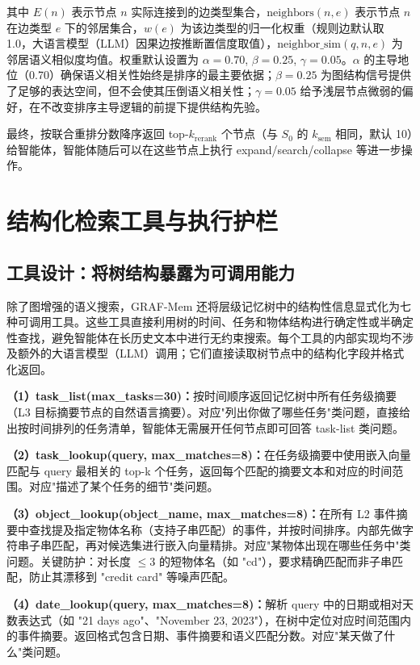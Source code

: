 其中 $E(n)$ 表示节点 $n$ 实际连接到的边类型集合，$\mathrm{neighbors}(n, e)$ 表示节点 $n$ 在边类型 $e$ 下的邻居集合，$w(e)$ 为该边类型的归一化权重（规则边默认取 1.0，大语言模型（LLM）因果边按推断置信度取值），$\mathrm{neighbor\_sim}(q, n, e)$ 为邻居语义相似度均值。权重默认设置为 $\alpha=0.70$, $\beta=0.25$, $\gamma=0.05$。$\alpha$ 的主导地位（0.70）确保语义相关性始终是排序的最主要依据；$\beta=0.25$ 为图结构信号提供了足够的表达空间，但不会使其压倒语义相关性；$\gamma=0.05$ 给予浅层节点微弱的偏好，在不改变排序主导逻辑的前提下提供结构先验。

最终，按联合重排分数降序返回 top-$k_{\mathrm{rerank}}$ 个节点（与 $S_0$ 的 $k_{\mathrm{sem}}$ 相同，默认 10）给智能体，智能体随后可以在这些节点上执行 expand/search/collapse 等进一步操作。

\section{结构化检索工具与执行护栏}

\subsection{工具设计：将树结构暴露为可调用能力}

除了图增强的语义搜索，GRAF-Mem 还将层级记忆树中的结构性信息显式化为七种可调用工具。这些工具直接利用树的时间、任务和物体结构进行确定性或半确定性查找，避免智能体在长历史文本中进行无约束搜索。每个工具的内部实现均不涉及额外的大语言模型（LLM）调用；它们直接读取树节点中的结构化字段并格式化返回。

\textbf{（1）task\_list(max\_tasks=30)：}按时间顺序返回记忆树中所有任务级摘要（L3 目标摘要节点的自然语言摘要）。对应"列出你做了哪些任务"类问题，直接给出按时间排列的任务清单，智能体无需展开任何节点即可回答 task-list 类问题。

\textbf{（2）task\_lookup(query, max\_matches=8)：}在任务级摘要中使用嵌入向量匹配与 query 最相关的 top-k 个任务，返回每个匹配的摘要文本和对应的时间范围。对应"描述了某个任务的细节"类问题。

\textbf{（3）object\_lookup(object\_name, max\_matches=8)：}在所有 L2 事件摘要中查找提及指定物体名称（支持子串匹配）的事件，并按时间排序。内部先做字符串子串匹配，再对候选集进行嵌入向量精排。对应"某物体出现在哪些任务中"类问题。关键防护：对长度 $\le 3$ 的短物体名（如 "cd"），要求精确匹配而非子串匹配，防止其漂移到 "credit card" 等噪声匹配。

\textbf{（4）date\_lookup(query, max\_matches=8)：}解析 query 中的日期或相对天数表达式（如 "21 days ago"、"November 23, 2023"），在树中定位对应时间范围内的事件摘要。返回格式包含日期、事件摘要和语义匹配分数。对应"某天做了什么"类问题。

